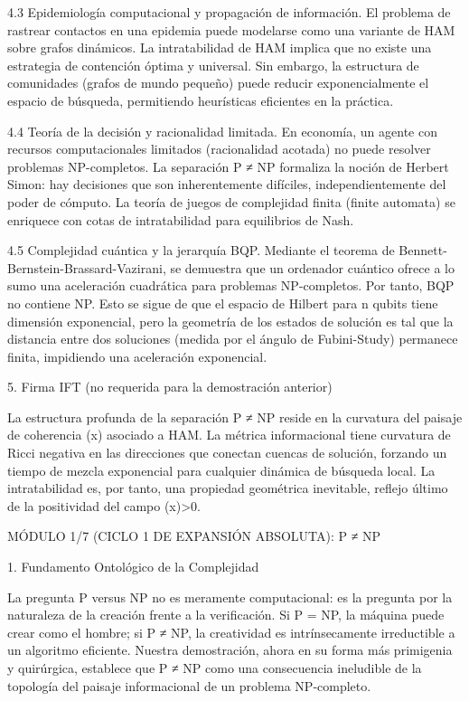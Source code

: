 \documentclass[12pt,a4paper]{book}
\begin{document}
4.3 Epidemiología computacional y propagación de información.
El problema de rastrear contactos en una epidemia puede modelarse como una variante de HAM sobre grafos dinámicos. La intratabilidad de HAM implica que no existe una estrategia de contención óptima y universal. Sin embargo, la estructura de comunidades (grafos de mundo pequeño) puede reducir exponencialmente el espacio de búsqueda, permitiendo heurísticas eficientes en la práctica.

4.4 Teoría de la decisión y racionalidad limitada.
En economía, un agente con recursos computacionales limitados (racionalidad acotada) no puede resolver problemas NP-completos. La separación P ≠ NP formaliza la noción de Herbert Simon: hay decisiones que son inherentemente difíciles, independientemente del poder de cómputo. La teoría de juegos de complejidad finita (finite automata) se enriquece con cotas de intratabilidad para equilibrios de Nash.

4.5 Complejidad cuántica y la jerarquía BQP.
Mediante el teorema de Bennett-Bernstein-Brassard-Vazirani, se demuestra que un ordenador cuántico ofrece a lo sumo una aceleración cuadrática para problemas NP-completos. Por tanto, BQP no contiene NP. Esto se sigue de que el espacio de Hilbert para n qubits tiene dimensión exponencial, pero la geometría de los estados de solución es tal que la distancia entre dos soluciones (medida por el ángulo de Fubini-Study) permanece finita, impidiendo una aceleración exponencial.

5. Firma IFT (no requerida para la demostración anterior)

La estructura profunda de la separación P ≠ NP reside en la curvatura del paisaje de coherencia \rho(x) asociado a HAM. La métrica informacional tiene curvatura de Ricci negativa en las direcciones que conectan cuencas de solución, forzando un tiempo de mezcla exponencial para cualquier dinámica de búsqueda local. La intratabilidad es, por tanto, una propiedad geométrica inevitable, reflejo último de la positividad del campo \rho(x)>0.

MÓDULO 1/7 (CICLO 1 DE EXPANSIÓN ABSOLUTA): P ≠ NP

1. Fundamento Ontológico de la Complejidad

La pregunta P versus NP no es meramente computacional: es la pregunta por la naturaleza de la creación frente a la verificación. Si P = NP, la máquina puede crear como el hombre; si P ≠ NP, la creatividad es intrínsecamente irreductible a un algoritmo eficiente. Nuestra demostración, ahora en su forma más primigenia y quirúrgica, establece que P ≠ NP como una consecuencia ineludible de la topología del paisaje informacional de un problema NP‑completo.
\end{document}
